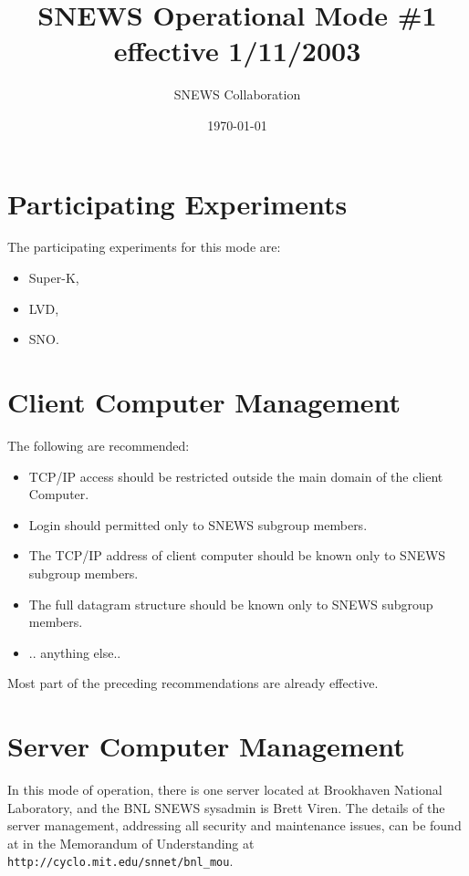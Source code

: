 \documentclass{article}
\begin{document}
\title{SNEWS Operational Mode \#1 effective 1/11/2003}         
\author{SNEWS Collaboration}
\date{\today}
\maketitle

\section{Participating Experiments}

The participating experiments for this mode are:

\begin{itemize}
\item Super-K,
\item LVD,
\item SNO.
\end{itemize}

\section{Client Computer Management}

The following are recommended:

\begin{itemize}
\item TCP/IP access should be restricted outside the main domain of the 
client Computer.
\item Login should permitted only to SNEWS subgroup members.
\item The TCP/IP address of client computer should be known only to SNEWS subgroup members.
\item The full datagram structure should be known only to SNEWS subgroup members.
\item .. anything else..
\end{itemize}
Most part of the preceding recommendations are already effective.

\section{Server Computer Management}

In this mode of operation, there is one server located at Brookhaven
National Laboratory, and the BNL SNEWS sysadmin is Brett Viren.
The details of the server management, addressing all
security and maintenance issues, can be found at
in the Memorandum of Understanding at
{\tt http://cyclo.mit.edu/snnet/bnl\_mou}.
\end{document}
